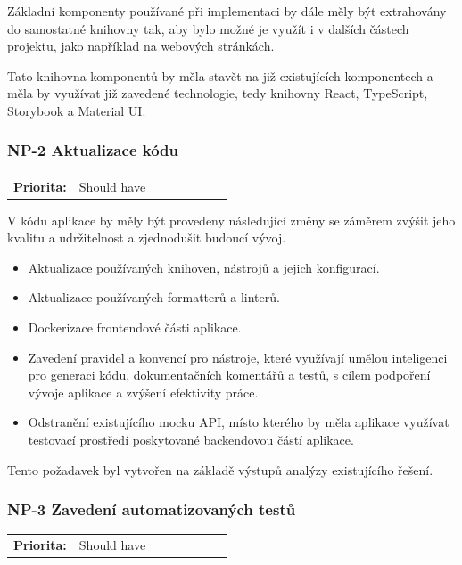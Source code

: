 Základní komponenty používané při implementaci by dále měly být extrahovány do samostatné knihovny tak, aby bylo možné je využít i v dalších částech projektu, jako například na webových stránkách.

Tato knihovna komponentů by měla stavět na již existujících komponentech a měla by využívat již zavedené technologie, tedy knihovny React, TypeScript, Storybook a Material UI.


\subsubsection{NP-2 Aktualizace kódu}

\begin{tabular}{lp{0.7\linewidth}}
    \textbf{Priorita:} & Should have \\
\end{tabular}

V kódu aplikace by měly být provedeny následující změny se záměrem zvýšit jeho kvalitu a udržitelnost a zjednodušit budoucí vývoj.

\begin{itemize}
    \item Aktualizace používaných knihoven, nástrojů a jejich konfigurací.
    \item Aktualizace používaných formatterů a linterů.
    \item Dockerizace frontendové části aplikace.
    \item Zavedení pravidel a konvencí pro nástroje, které využívají umělou inteligenci pro generaci kódu, dokumentačních komentářů a testů, s cílem podpoření vývoje aplikace a zvýšení efektivity práce.
    \item Odstranění existujícího mocku API, místo kterého by měla aplikace využívat testovací prostředí poskytované backendovou částí aplikace.
\end{itemize}

Tento požadavek byl vytvořen na základě výstupů analýzy existujícího řešení.

\subsubsection{NP-3 Zavedení automatizovaných testů}

\begin{tabular}{lp{0.7\linewidth}}
    \textbf{Priorita:} & Should have \\
\end{tabular}


